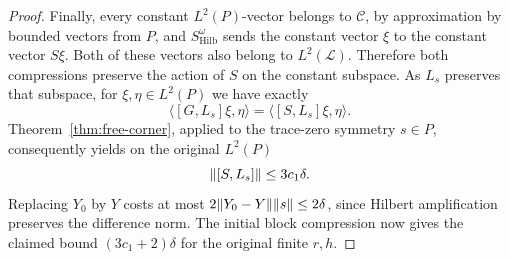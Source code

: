 \begin{proof}
Finally, every constant \(L^2(P)\)-vector belongs to \(\mathcal C\),
by approximation by bounded vectors from \(P\), and
\(S^{\omega}_{\mathrm{Hilb}}\) sends the constant vector \(\xi\) to
the constant vector \(S\xi\).  Both of these vectors also belong to
\(L^2(\mathcal L)\).  Therefore both compressions preserve the action
of \(S\) on the constant subspace.  As \(L_s\) preserves that subspace,
for \(\xi,\eta\in L^2(P)\) we have exactly
\[
 \langle[G,L_s]\xi,\eta\rangle
        =\langle[S,L_s]\xi,\eta\rangle.
\]
Theorem~\ref{thm:free-corner}, applied to the trace-zero symmetry
\(s\in P\), consequently yields on the original \(L^2(P)\)
\[
                   \lVert[S,L_s]\rVert\leq3c_1\delta.
\]
Replacing \(Y_0\) by \(Y\) costs at most
\(2\lVert Y_0-Y\rVert\lVert s\rVert\leq2\delta\), since Hilbert amplification
preserves the difference norm.  The initial block compression now
gives the claimed bound \((3c_1+2)\delta\) for the original finite
\(r,h\).
\end{proof}

